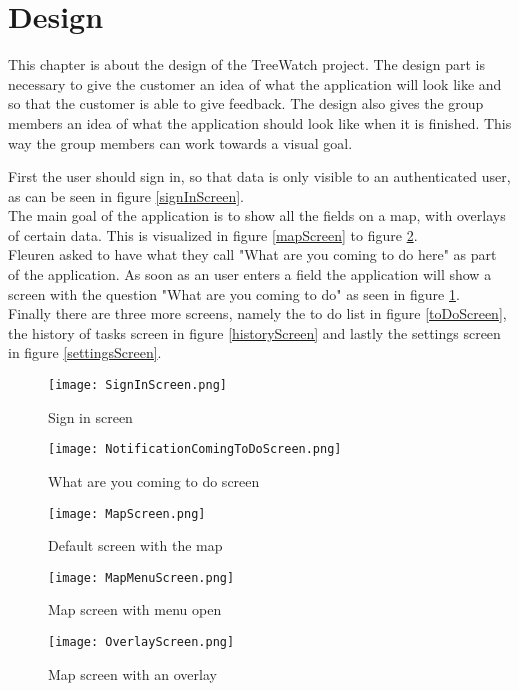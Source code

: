 \section{Design}
This chapter is about the design of the TreeWatch project. The design part is necessary to give the customer an idea of what the application will look like and so that the customer is able to give feedback. The design also gives the group members an idea of what the application should look like when it is finished. This way the group members can work towards a visual goal.

First the user should sign in, so that data is only visible to an authenticated user, as can be seen in figure \ref{signInScreen}. \\
The main goal of the application is to show all the fields on a map, with overlays of certain data. This is visualized in figure \ref{mapScreen} to figure \ref{overlayScreen}. \\
Fleuren asked to have what they call "What are you coming to do here" as part of the application. As soon as an user enters a field the application will show a screen with the question "What are you coming to do" as seen in figure \ref{comingToDoScreen}. \\
Finally there are three more screens, namely the to do list in figure \ref{toDoScreen}, the history of tasks screen in figure \ref{historyScreen} and lastly the settings screen in figure \ref{settingsScreen}.

\begin{figure}[ht]
	\centering
	\texttt{[image: SignInScreen.png]}
	\caption{Sign in screen}\label{signInScreen}
	\endminipage\hfill
	\centering
	\texttt{[image: NotificationComingToDoScreen.png]}
	\caption{What are you coming to do screen}\label{comingToDoScreen}
	\endminipage\hfill
\end{figure}

\begin{figure}[ht]
	\centering
	\texttt{[image: MapScreen.png]}
	\caption{Default screen with the map}\label{mapScreen}
	\endminipage\hfill
	\centering
	\texttt{[image: MapMenuScreen.png]}
	\caption{Map screen with menu open}\label{mapMenuScreen}
	\endminipage\hfill
	\centering
	\texttt{[image: OverlayScreen.png]}
	\caption{Map screen with an overlay}\label{overlayScreen}
	\endminipage\hfill
\end{figure}

